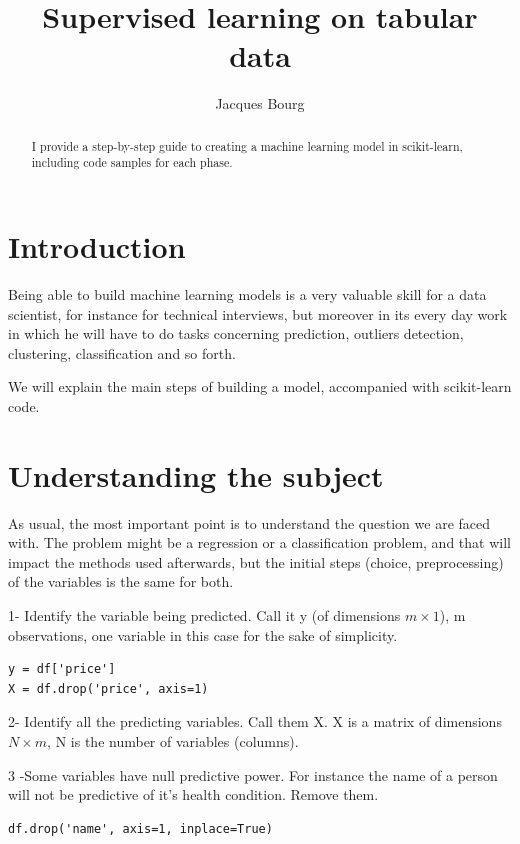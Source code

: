 \documentclass[24pt]{article}
\title{Supervised learning on  tabular data}
\author{Jacques Bourg}
\begin{document}
\maketitle

\begin{abstract}
I provide a step-by-step guide to creating a machine learning model in scikit-learn, including code samples for each phase.
\end{abstract}


\section{Introduction}
 
Being able to build machine learning models is a very valuable skill for a data scientist, for instance for technical interviews, but moreover in its every day work in which he will have to do tasks concerning prediction, outliers detection, clustering, classification and so forth.   
   
We will explain the main steps of building a model, accompanied with scikit-learn code. 

  
\section{Understanding the subject}

 As usual, the most important point is to understand the question we are faced with. The problem might be a regression or a classification problem, and that will impact the methods used afterwards, but the initial steps (choice, preprocessing) of  the variables is the same for both.

1- Identify the variable being predicted. Call it y (of dimensions $m \times 1$), m observations, one variable in this case for the sake of simplicity.

\begin{lstlisting}
y = df['price']
X = df.drop('price', axis=1)
\end{lstlisting}

2- Identify all the predicting variables. Call them X. X is a matrix of dimensions $N \times m$, N is the number of variables (columns).

3 -Some variables have null predictive power.  For instance the name of a person will not be predictive of it's health  condition. Remove them.

\begin{lstlisting}
df.drop('name', axis=1, inplace=True)
\end{lstlisting}
\end{document}
